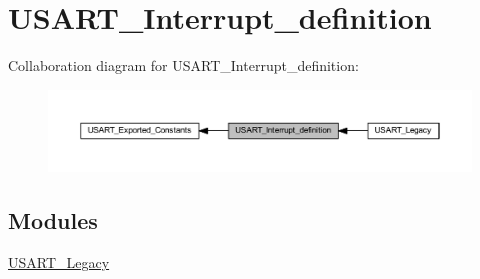 \hypertarget{group___u_s_a_r_t___interrupt__definition}{}\section{U\+S\+A\+R\+T\+\_\+\+Interrupt\+\_\+definition}
\label{group___u_s_a_r_t___interrupt__definition}
Collaboration diagram for U\+S\+A\+R\+T\+\_\+\+Interrupt\+\_\+definition\+:\nopagebreak
\begin{figure}[H]
\begin{center}
\leavevmode
\includegraphics[width=350pt]{group___u_s_a_r_t___interrupt__definition}
\end{center}
\end{figure}
\subsection*{Modules}
\begin{DoxyCompactItemize}
\item 
\hyperlink{group___u_s_a_r_t___legacy}{U\+S\+A\+R\+T\+\_\+\+Legacy}
\end{DoxyCompactItemize}
